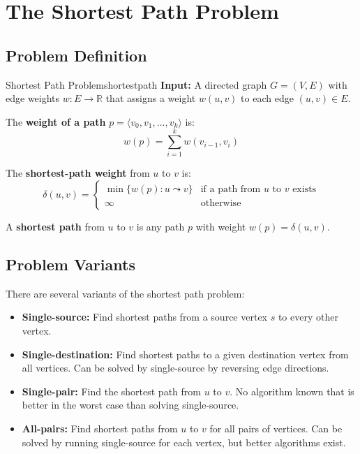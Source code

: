 
\section*{The Shortest Path Problem}

\subsection{Problem Definition}

\begin{definition}{Shortest Path Problem}{shortestpath}
\textbf{Input:} A directed graph $G = (V, E)$ with edge weights $w: E \to \mathbb{R}$ 
that assigns a weight $w(u,v)$ to each edge $(u,v) \in E$.

The \textbf{weight of a path} $p = \langle v_0, v_1, \ldots, v_k \rangle$ is:
\[
w(p) = \sum_{i=1}^{k} w(v_{i-1}, v_i)
\]

The \textbf{shortest-path weight} from $u$ to $v$ is:
\[
\delta(u,v) = \begin{cases}
\min\{w(p) : u \leadsto v\} & \text{if a path from } u \text{ to } v \text{ exists} \\
\infty & \text{otherwise}
\end{cases}
\]

A \textbf{shortest path} from $u$ to $v$ is any path $p$ with weight $w(p) = \delta(u,v)$.
\end{definition}

\subsection{Problem Variants}

There are several variants of the shortest path problem:

\begin{itemize}[noitemsep]
  \item \textbf{Single-source:} Find shortest paths from a source vertex $s$ to every other vertex.
  \item \textbf{Single-destination:} Find shortest paths to a given destination vertex from all vertices. 
        Can be solved by single-source by reversing edge directions.
  \item \textbf{Single-pair:} Find the shortest path from $u$ to $v$. No algorithm known that is 
        better in the worst case than solving single-source.
  \item \textbf{All-pairs:} Find shortest paths from $u$ to $v$ for all pairs of vertices. Can be 
        solved by running single-source for each vertex, but better algorithms exist.
\end{itemize}

